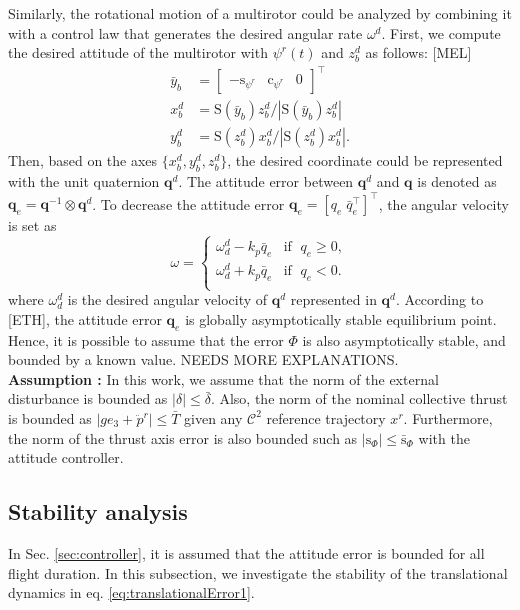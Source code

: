 \documentclass[letterpaper, 10 pt, conference]{ieeeconf}  %
\begin{document}
Similarly, the rotational motion of a multirotor could be analyzed by combining it with a control law that generates the desired angular rate $\omega^d$. 
First, we compute the desired attitude of the multirotor with $\psi^r(t)$ and $z_b^d$ as follows: [MEL]
\begin{align}
\bar{y}_b &= [\begin{array}{ccc}-\text{s}_{\psi^r}&\text{c}_{\psi^r}&0\end{array}]^\top \nonumber \\
x_b^d &= \text{S}(\bar{y}_b)z_b^d / |\text{S}(\bar{y}_b)z_b^d | \nonumber \\ 
y_b^d &= \text{S}({z}_b^d)x_b^d / |\text{S}(z_b^d)x_b^d |. \nonumber  
\end{align}
Then, based on the axes $\{x_b^d,y_b^d,z_b^d\}$, the desired coordinate could be represented with the unit quaternion $\textbf{q}^d$. 
The attitude error between $\textbf{q}^d$ and $\textbf{q}$ is denoted as $\textbf{q}_e = \textbf{q}^{-1}\otimes \textbf{q}^d$. To decrease the attitude error $\textbf{q}_e = [q_e\;\bar{q}_e^\top]^\top$, the angular velocity is set as 
\begin{equation}
\omega = \left\{
\begin{array}{ll}
\omega_d^d - k_p \bar{q}_e & \text{if  }\;q_e \geq 0, \\ 
\omega_d^d + k_p \bar{q}_e & \text{if  }\;q_e < 0. \\ 
\end{array}
\right.
\end{equation}
where $\omega_d^d$ is the desired angular velocity of $\textbf{q}^d$ represented in $\textbf{q}^d$.
According to [ETH], the attitude error $\textbf{q}_e$ is globally asymptotically stable equilibrium point. 
Hence, it is possible to assume that the error $\Phi$ is also asymptotically stable, and bounded by a known value. NEEDS MORE EXPLANATIONS.
\\
\textbf{Assumption : }
In this work, we assume that the norm of the external disturbance is bounded as $|\delta| \leq \bar{\delta}$. 
Also, the norm of the nominal collective thrust is bounded as $|ge_3 + \ddot{p}^r| \leq \bar{T}$ given any $\mathcal{C}^2$ reference trajectory $x^r$.  
Furthermore, the norm of the thrust axis error is also bounded such as $|\text{s}_\Phi| \leq \bar{\text{s}}_\Phi$ with the attitude controller.

\subsection{Stability analysis} \label{sec:stabilityAnalysis}
In Sec. \ref{sec:controller}, it is assumed that the attitude error is bounded for all flight duration.
In this subsection, we investigate the stability of the translational dynamics in eq. \eqref{eq:translationalError1}.  
\end{document}
